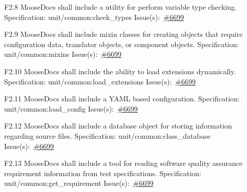 \begin{Requirement}{F2.8}
MooseDocs shall include a utility for perform variable type checking.
\newline
Specification: unit/common:check\_types
\newline
Issue(s):~\href{https://github.com/idaholab/moose/issues/6699}{\#6699}
\end{Requirement}

\begin{Requirement}{F2.9}
MooseDocs shall include mixin classes for creating objects that require configuration data, translator objects, or component objects.
\newline
Specification: unit/common:mixins
\newline
Issue(s):~\href{https://github.com/idaholab/moose/issues/6699}{\#6699}
\end{Requirement}

\begin{Requirement}{F2.10}
MooseDocs shall include the ability to load extensions dynamically.
\newline
Specification: unit/common:load\_extensions
\newline
Issue(s):~\href{https://github.com/idaholab/moose/issues/6699}{\#6699}
\end{Requirement}

\begin{Requirement}{F2.11}
MooseDocs shall include a YAML based configuration.
\newline
Specification: unit/common:load\_config
\newline
Issue(s):~\href{https://github.com/idaholab/moose/issues/6699}{\#6699}
\end{Requirement}

\begin{Requirement}{F2.12}
MooseDocs shall include a database object for storing information regarding source files.
\newline
Specification: unit/common:class\_database
\newline
Issue(s):~\href{https://github.com/idaholab/moose/issues/6699}{\#6699}
\end{Requirement}

\begin{Requirement}{F2.13}
MooseDocs shall include a tool for reading software quality assurance requirement information from test specifications.
\newline
Specification: unit/common:get\_requirement
\newline
Issue(s):~\href{https://github.com/idaholab/moose/issues/6699}{\#6699}
\end{Requirement}

